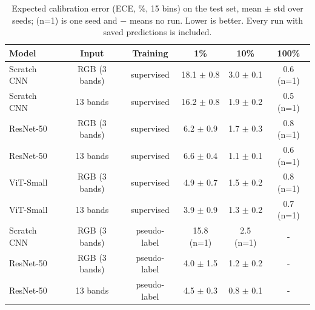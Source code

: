 \begin{table}[t]
\centering
\caption{Expected calibration error (ECE, \%, 15 bins) on the test set, mean $\pm$ std over seeds; (n=1) is one seed and $-$ means no run. Lower is better. Every run with saved predictions is included.}
\label{tab:calibration}
\small
\begin{tabular}{lccccc}
\toprule
Model & Input & Training & 1\% & 10\% & 100\% \\
\midrule
Scratch CNN & RGB (3 bands) & supervised & 18.1 $\pm$ 0.8 & 3.0 $\pm$ 0.1 & 0.6 (n=1) \\
Scratch CNN & 13 bands & supervised & 16.2 $\pm$ 0.8 & 1.9 $\pm$ 0.2 & 0.5 (n=1) \\
ResNet-50 & RGB (3 bands) & supervised & 6.2 $\pm$ 0.9 & 1.7 $\pm$ 0.3 & 0.8 (n=1) \\
ResNet-50 & 13 bands & supervised & 6.6 $\pm$ 0.4 & 1.1 $\pm$ 0.1 & 0.6 (n=1) \\
ViT-Small & RGB (3 bands) & supervised & 4.9 $\pm$ 0.7 & 1.5 $\pm$ 0.2 & 0.8 (n=1) \\
ViT-Small & 13 bands & supervised & 3.9 $\pm$ 0.9 & 1.3 $\pm$ 0.2 & 0.7 (n=1) \\
Scratch CNN & RGB (3 bands) & pseudo-label & 15.8 (n=1) & 2.5 (n=1) & - \\
ResNet-50 & RGB (3 bands) & pseudo-label & 4.0 $\pm$ 1.5 & 1.2 $\pm$ 0.2 & - \\
ResNet-50 & 13 bands & pseudo-label & 4.5 $\pm$ 0.3 & 0.8 $\pm$ 0.1 & - \\
\bottomrule
\end{tabular}
\end{table}
